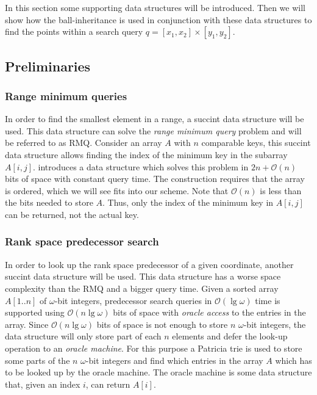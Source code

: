 In this section some supporting data structures will be introduced. Then we will show how the ball-inheritance is used in conjunction with these data structures to find the points within a search query $q = [x_1, x_2] \times [y_1, y_2]$.

\subsection{Preliminaries}

\subsubsection{Range minimum queries}
In order to find the smallest element in a range, a succint data structure will be used. This data structure can solve the \emph{range minimum query} problem and will be referred to as RMQ. 
Consider an array $A$ with $n$ comparable keys, this succint data structure allows finding the index of the minimum key in the subarray $A[i,j]$. \citet{fischer} introduces a data structure which solves this problem in $2n + \mathcal{O}(n)$ bits of space with constant query time. The construction requires that the array is ordered, which we will see fits into our scheme. Note that $\mathcal{O}(n)$ is less than the bits needed to store $A$. Thus, only the index of the minimum key in $A[i,j]$ can be returned, not the actual key.


\subsubsection{Rank space predecessor search}
In order to look up the rank space predecessor of a given coordinate, another succint data structure will be used. This data structure has a worse space complexity than the RMQ and a bigger query time.
Given a sorted array $A[1..n]$ of $\omega$-bit integers, predecessor search queries in $\mathcal{O}(\lg \omega)$ time is supported using $\mathcal{O}(n \lg \omega)$ bits of space with \emph{oracle access} to the entries in the array. Since $\mathcal{O}(n \lg \omega)$ bits of space is not enough to store $n$ $\omega$-bit integers, the data structure will only store part of each $n$ elements and defer the look-up operation to an \emph{oracle machine}. For this purpose a Patricia trie \cite{morehaste} is used to store some parts of the $n$ $\omega$-bit integers and find which entries in the array $A$ which has to be looked up by the oracle machine. The oracle machine is some data structure that, given an index $i$, can return $A[i]$. 

